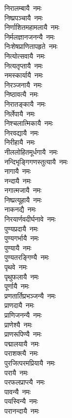 \begin{multicols}{\maxColumns}
\begin{flushleft}
निरालम्बायै~नमः\\
निष्प्रपञ्चायै~नमः\hfill{}\\
निर्णाशितमहामलायै~नमः\\
निर्मलज्ञानजनन्यै~नमः\\
निःशेषप्राणितापहृते~नमः\\
नित्योत्सवायै~नमः\\
नित्यतृप्तायै~नमः\\
नमस्कार्यायै~नमः\\
निरञ्जनायै~नमः\\
निष्ठावत्यै~नमः\\
निरातङ्कायै~नमः\\
निर्लेपायै~नमः\hfill{}\\
निश्चलात्मिकायै~नमः\\
निरवद्यायै~नमः\\
निरीहायै~नमः\\
नीललोहितमूर्धगायै~नमः\\
नन्दिभृङ्गिगणस्तुत्यायै~नमः\\
नागायै~नमः\\
नन्दायै~नमः\\
नगात्मजायै~नमः\\
निष्प्रत्यूहायै~नमः\\
नाकनद्यै~नमः\hfill{}\\
निरयार्णवदीर्घनावे~नमः\\
पुण्यप्रदायै~नमः\\
पुण्यगर्भायै~नमः\\
पुण्यायै~नमः\\
पुण्यतरङ्गिण्यै~नमः\\
पृथवे~नमः\\
पृथुफलायै~नमः\\
पूर्णायै~नमः\\
प्रणतार्तिप्रभञ्जन्यै~नमः\\
प्राणदायै~नमः\hfill{}\\
प्राणिजनन्यै~नमः\\
प्राणेश्यै~नमः\\
प्राणरूपिण्यै~नमः\\
पद्मालयायै~नमः\\
पराशक्त्यै~नमः\\
पुरजित्परमप्रियायै~नमः\\
परायै~नमः\\
परफलप्राप्त्यै~नमः\\
पावन्यै~नमः\\
पयस्विन्यै~नमः\hfill{}\\
परानन्दायै~नमः\\

\end{flushleft}
\end{multicols}
